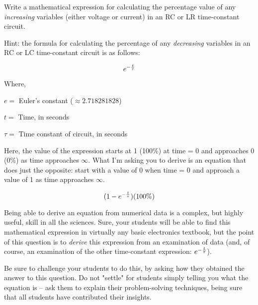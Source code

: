 

Write a mathematical expression for calculating the percentage value of any {\it increasing} variables (either voltage or current) in an RC or LR time-constant circuit.

Hint: the formula for calculating the percentage of any {\it decreasing} variables in an RC or LC time-constant circuit is as follows:

$$e^{-{t \over \tau}}$$

\noindent
Where,

$e =$ Euler's constant ($\approx 2.718281828$)

$t =$ Time, in seconds

$\tau =$ Time constant of circuit, in seconds

\vskip 10pt

Here, the value of the expression starts at 1 (100\%) at time = 0 and approaches 0 (0\%) as time approaches $\infty$.  What I'm asking you to derive is an equation that does just the opposite: start with a value of 0 when time = 0 and approach a value of 1 as time approaches $\infty$.







$$(1 - e^{-{t \over \tau}})(100\%)$$







Being able to derive an equation from numerical data is a complex, but highly useful, skill in all the sciences.  Sure, your students will be able to find this mathematical expression in virtually any basic electronics textbook, but the point of this question is to {\it derive} this expression from an examination of data (and, of course, an examination of the other time-constant expression: $e^{-{t \over \tau}}$).

Be sure to challenge your students to do this, by asking how they obtained the answer to this question.  Do not "settle" for students simply telling you what the equation is -- ask them to explain their problem-solving techniques, being sure that all students have contributed their insights.




